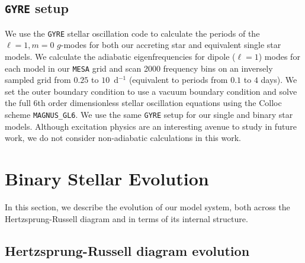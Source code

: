 \documentclass[twocolumn, twocolappendix, oneside]{aastex631}
\newcommand{\hrd}{Hertzsprung-Russell diagram\xspace}
\newcommand{\gmodes}{$g$-modes\xspace}
\newcommand{\mesa}{\texttt{MESA}\xspace}
\newcommand{\gyre}{\texttt{GYRE}\xspace}
\begin{document}
\subsection{\gyre setup} \label{sec: gyre_setup}

We use the \gyre stellar oscillation code \citep[version 7.1, ][]{Townsend+2013,Townsend+2018,Goldstein+2020,Sun+2023} to calculate the periods of the ${\ell = 1}, {m = 0}$ \gmodes for both our accreting star and equivalent single star models. We calculate the adiabatic eigenfrequencies for dipole ($\ell=1$) modes for each model in our \mesa grid and scan 2000 frequency bins on an inversely sampled grid from $0.25$ to $10$~d$^{-1}$ (equivalent to periods from $0.1$ to $4$ days). We set the outer boundary condition to use a vacuum boundary condition and solve the full 6th order dimensionless stellar oscillation equations \citep{Dziembowski+1971, Christensen-Dalsgaard+2008} using the Colloc scheme \texttt{MAGNUS\_GL6}. We use the same \gyre setup for our single and binary star models. Although excitation physics are an interesting avenue to study in future work, we do not consider non-adiabatic calculations in this work.

\section{Binary Stellar Evolution}\label{sec:bse}

In this section, we describe the evolution of our model system, both across the \hrd and in terms of its internal structure.

\subsection{\hrd evolution}\label{sec:hrd}
\end{document}
